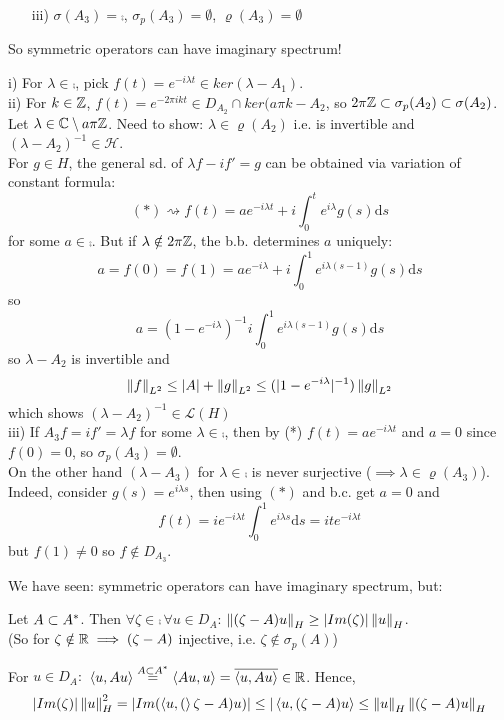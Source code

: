 \begin{example}
\begin{itemize}
		\item [iii)] $\sigma(A_3)=\comp$, $\sigma_p(A_3)=\emptyset$, $\varrho(A_3)=\emptyset$
	\end{itemize}
	So symmetric operators can have imaginary spectrum!
	\begin{pf}{}{}
		i) For $\lambda\in\comp$, pick $f(t)=e^{-i\lambda t}\in ker(\lambda-A_1)$.\\
		ii) For $k\in\mathbb{Z}$, $f(t)=e^{-2\pi ikt}\in D_{A_2}\cap ker(a\pi k-A_2$,
		so $2\pi \mathbb{Z}\subset \sigma_p(A_2)\subset\sigma(A_2)$.
		Let $\lambda\in\mathbb{C}\setminus a\pi\mathbb{Z}$.
		Need to show: $\lambda\in\varrho(A_2)$ i.e.  is invertible and $(\lambda-A_2)^{-1}\in\mathcal{H}$.\\
		For $g\in H$, the general sd. of $\lambda f-if'=g$ can be obtained via variation of constant formula:
		$$
			(*)\rightsquigarrow f(t)=ae^{-i\lambda t}+i \int_0^t e^{i\lambda}g(s)\mathrm{d}s
		$$
		for some $a\in\comp$. But if $\lambda\notin2\pi\mathbb{Z}$, the b.b. determines $a$ uniquely:
		$$
			a=f(0)=f(1)=ae^{-i\lambda}+i\int_0^1e^{i\lambda(s-1)}g(s)\mathrm{d}s$$
		so
		$$
			a=(1-e^{-i\lambda})^{-1}i\int_0^1e^{i\lambda(s-1)}g(s)\mathrm{d}s
		$$
		so $\lambda-A_2$ is invertible and
		$$
        \left\|{f}\right\|_{L^2}\leq |A|+\left\|{g}\right\|_{L^2}\leq(|1-e^{-i\lambda}|^{-1})\left\|{g}\right\|_{L^2}
        $$
		which shows $(\lambda-A_2)^{-1}\in\mathcal{L}(H)$\\
		iii) If $A_3f=if'=\lambda f$ for some $\lambda\in\comp$, then by (*) $f(t)=ae^{-i\lambda t}$ and $a=0$ since $f(0)=0$, so $\sigma_p(A_3)=\emptyset$.\\
		On the other hand $(\lambda-A_3)$ for $\lambda\in\comp$ is never surjective ($\implies \lambda\in\varrho(A_3)$). Indeed, consider $g(s)=e^{i\lambda s}$, then using $(*)$ and b.c. get $a=0$ and
		$$
        f(t)=ie^{-i\lambda t}\int_0^1e^{i\lambda s} \mathrm{d}s=ite^{-i\lambda t}
        $$
		but $f(1)\neq0$ so $f\notin D_{A_3}$.
	\end{pf}
\end{example}
We have seen: symmetric operators can have imaginary spectrum, but:
\begin{lemma}
	Let $A\subset {A}^*$. Then $\forall\zeta\in\comp\,\forall u\in D_A$: $\left\|{(\zeta-A)u}\right\|_H\geq |Im(\zeta)|\left\|{u}\right\|_H$.\\
	(So for $\zeta\notin\mathbb{R}\implies(\zeta-A)$ injective, i.e. $\zeta\notin\sigma_p(A)$)
	\begin{pf}{}{}
		For $u\in D_A:$ $\left<{u},{Au}\right>\stackrel{A\subset{A}^*}{=}\left<{Au},{u}\right>=\overline{\left<{u},{Au}\right>}\in\mathbb{R}$. Hence,
		$$
			|Im(\zeta)|\left\|{u}\right\|^2_H=|Im(\left<{u},{(}\right>\zeta-A)u)|\leq|\left<{u},{(\zeta-A)u}\right>\leq\left\|{u}\right\|_H\left\|{(\zeta-A)u}\right\|_H
		$$
	\end{pf}
\end{lemma}
